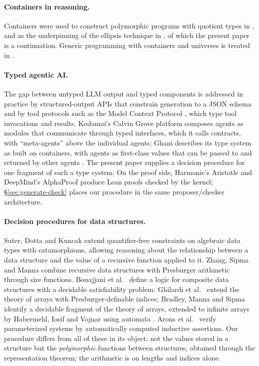 \documentclass{fundam}
\begin{document}
\paragraph{Containers in reasoning.}  Containers were used to construct polymorphic
programs with quotient types in \cite{AbbottAltenkirchGhaniMcBride04}, and as the
underpinning of the ellipsis technique in \cite{PrinceGhaniMcBride08}, of which the
present paper is a continuation.  Generic programming with containers and universes is
treated in \cite{AltenkirchMcBrideMorris07,Morris07}.

\paragraph{Typed agentic AI.}  The gap between untyped LLM output and typed components is
addressed in practice by structured-output APIs that constrain generation to a JSON schema
\cite{OpenAIStructured24} and by tool protocols such as the Model Context Protocol
\cite{MCP24}, which type tool invocations and results.  Kodamai's Calvin Grove platform
\cite{KodamaiEEJ26} composes agents as modules that communicate through typed
interfaces, which it calls contracts, with ``meta-agents'' above the individual agents;
Ghani describes its type system as built on containers, with agents as first-class
values that can be passed to and returned by other agents \cite{GhaniPodcast26}.  The present paper supplies a
decision procedure for one fragment of such a type system.  On the proof side, Harmonic's
Aristotle \cite{Harmonic25} and DeepMind's AlphaProof \cite{AlphaProof25} produce
Lean proofs checked by the kernel; \S\ref{sec:generate-check} places our procedure in the
same proposer/checker architecture.

\paragraph{Decision procedures for data structures.}  Suter, Dotta and Kuncak
\cite{SuterDottaKuncak10} extend quantifier-free constraints on algebraic data types with
catamorphisms, allowing reasoning about the relationship between a data structure and the
value of a recursive function applied to it.  Zhang, Sipma and Manna \cite{ZhangSipmaManna04}
combine recursive data structures with Presburger arithmetic through size functions.
Bouajjani et al.\ \cite{BouajjaniDrEnSi09} define a logic for composite data structures
with a decidable satisfiability problem.  Ghilardi et al.\ \cite{GhilardiNRZ07} extend the
theory of arrays with Presburger-definable indices; Bradley, Manna and Sipma
\cite{BradleyMannaSipma06} identify a decidable fragment of the theory of arrays,
extended to infinite arrays by Habermehl, Iosif and Vojnar \cite{HabermehlIosifVojnar08}
using automata \cite{Buchi60}.  Arons et al.\ \cite{AronsPRXZ01} verify parameterized systems
by automatically computed inductive assertions.  Our procedure differs from all of these in
its object: not the values stored in a structure but the \emph{polymorphic} functions
between structures, obtained through the representation theorem; the arithmetic is on
lengths and indices alone.
\end{document}
